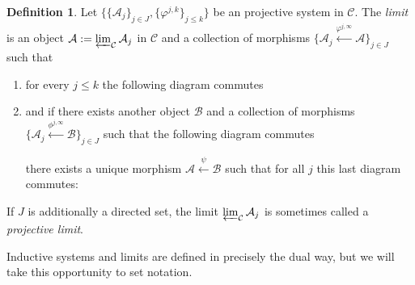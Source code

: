 \documentclass[12pt]{article}
\theoremstyle{definition}
\newtheorem{definition}[theorem]{Definition}
\newcommand{\mc}[1]{\mathcal{#1}}
\newcommand{\<}{\langle}
\renewcommand{\>}{\rangle}
\begin{document}
\begin{definition}
    Let $\{\{\mc A_j\}_{j \in J}, \{\varphi^{j,k}\}_{j\leq k}\}$ be an projective system in $\mc C$. The \textit{limit} is an object $\mc A:= \varprojlim_{\mc C} \mc A_j$ in $\mc C$ and a collection of morphisms $\{\mc A_j \overset{\varphi^{j,\infty}}{\leftarrow} \mc A\}_{j \in J}$ such that
    \begin{enumerate}
        \item for every $j \leq k$ the following diagram commutes
        \begin{center}
    \end{center}
    \item and if there exists another object $\mc B$ and a collection of morphisms $\{\mc A_j \overset{\phi^{j,\infty}}{\leftarrow} \mc B\}_{j \in J}$ such that the following diagram commutes
    \begin{center}
    \end{center}
    there exists a unique morphism $\mc A \overset{\psi}{\leftarrow} \mc B$ such that for all $j$ this last diagram commutes:
    \begin{center}
    \end{center}
    \end{enumerate}
    If $J$ is additionally a directed set, the limit $\varprojlim_{\mc C} \mc A_j$ is sometimes called a \textit{projective limit}.
\end{definition}

Inductive systems and limits are defined in precisely the dual way, but we will take this opportunity to set notation.
\end{document}
